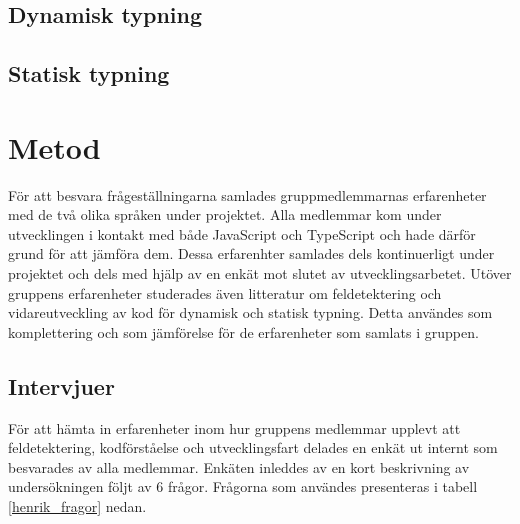 \subsection{Dynamisk typning}
\subsection{Statisk typning}
\section{Metod}
För att besvara frågeställningarna samlades gruppmedlemmarnas erfarenheter med de två olika språken under projektet. Alla medlemmar kom under utvecklingen i kontakt med både JavaScript och TypeScript och hade därför grund för att jämföra dem. Dessa erfarenhter samlades dels kontinuerligt under projektet och dels med hjälp av en enkät mot slutet av utvecklingsarbetet. Utöver gruppens erfarenheter studerades även litteratur om feldetektering och vidareutveckling av kod för dynamisk och statisk typning. Detta användes som komplettering och som jämförelse för de erfarenheter som samlats i gruppen.
\subsection{Intervjuer}
För att hämta in erfarenheter inom hur gruppens medlemmar upplevt att feldetektering, kodförståelse och utvecklingsfart delades en enkät ut internt som besvarades av alla medlemmar. Enkäten inleddes av en kort beskrivning av undersökningen följt av 6 frågor. Frågorna som användes presenteras i tabell \ref{henrik_fragor} nedan.

